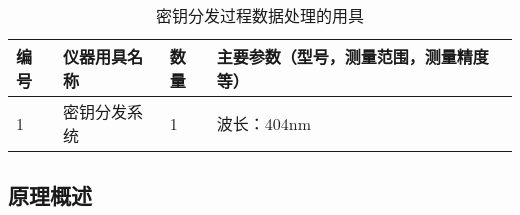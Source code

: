 \documentclass[dvipsnames, svgnames,a4paper,11pt]{article}
\begin{document}
\begin{table}[htbp]
	\centering
	\renewcommand\arraystretch{1.6}
	\caption{密钥分发过程数据处理的用具}
	\begin{tabular}{p{}|p{}|p{}|p{}}
		\hline
		编号& 仪器用具名称 & 数量 &  主要参数（型号，测量范围，测量精度等） \\
		\hline
		1	&	密钥分发系统 	& 1 & 波长：404nm	\\
		\hline
	\end{tabular}
	\label{tbl:密钥分发过程数据处理的用具}

\end{table}

\clearpage

\subsection{原理概述}
\end{document}

